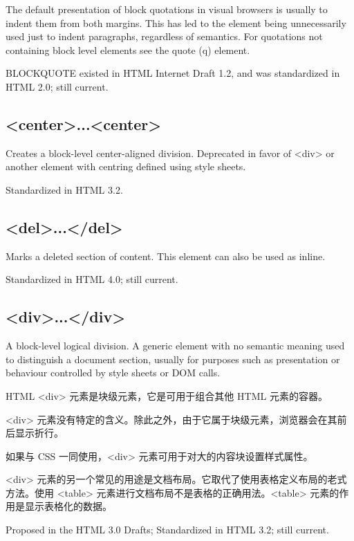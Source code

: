 The default presentation of block quotations in visual browsers is usually to indent them from both margins. This has led to the element being unnecessarily used just to indent paragraphs, regardless of semantics. For quotations not containing block level elements see the quote (q) element.

BLOCKQUOTE existed in HTML Internet Draft 1.2, and was standardized in HTML 2.0; still current. 




\subsection{<center>...<center>}


Creates a block-level center-aligned division. Deprecated in favor of <div> or another element with centring defined using style sheets.

Standardized in HTML 3.2.


\subsection{<del>...</del>}

Marks a deleted section of content. This element can also be used as inline.

Standardized in HTML 4.0; still current.







\subsection{<div>...</div>}

A block-level logical division. A generic element with no semantic meaning used to distinguish a document section, usually for purposes such as presentation or behaviour controlled by style sheets or DOM calls.

HTML <div> 元素是块级元素，它是可用于组合其他 HTML 元素的容器。

<div> 元素没有特定的含义。除此之外，由于它属于块级元素，浏览器会在其前后显示折行。

如果与 CSS 一同使用，<div> 元素可用于对大的内容块设置样式属性。

<div> 元素的另一个常见的用途是文档布局。它取代了使用表格定义布局的老式方法。使用 <table> 元素进行文档布局不是表格的正确用法。<table> 元素的作用是显示表格化的数据。

Proposed in the HTML 3.0 Drafts; Standardized in HTML 3.2; still current.




